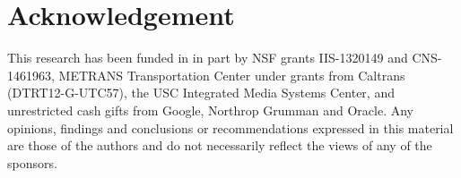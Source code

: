 \documentclass[large]{acmart}
\begin{document}


\maketitle




%

%





\section*{Acknowledgement}
This research has been funded in in part by NSF grants IIS-1320149 and CNS-1461963, METRANS Transportation Center under grants from Caltrans (DTRT12-G-UTC57), the USC Integrated Media Systems Center, and unrestricted cash gifts from Google, Northrop Grumman and Oracle. Any opinions, findings and conclusions or recommendations expressed in this material are those of the authors and do not necessarily reflect the views of any of the sponsors.

\begin{scriptsize}


\end{scriptsize}
\end{document}

